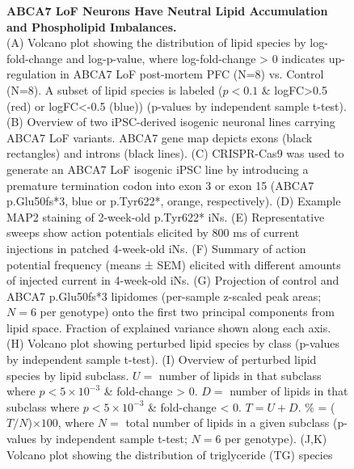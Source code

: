 \begin{figure}[ht]
    \caption{
        \textbf{ABCA7 LoF Neurons Have Neutral Lipid Accumulation and Phospholipid Imbalances.}\\[1ex]
        (A) Volcano plot showing the distribution of lipid species by log-fold-change and log-p-value, where log-fold-change > 0 indicates up-regulation in ABCA7 LoF post-mortem PFC (N=8) vs. Control (N=8). A subset of lipid species is labeled ($p<0.1$ \& logFC>0.5 (red) or logFC<-0.5 (blue)) (p-values by independent sample t-test). 
        (B) Overview of two iPSC-derived isogenic neuronal lines carrying ABCA7 LoF variants. ABCA7 gene map depicts exons (black rectangles) and introns (black lines). 
        (C) CRISPR-Cas9 was used to generate an ABCA7 LoF isogenic iPSC line by introducing a premature termination codon into exon 3 or exon 15 (ABCA7 p.Glu50fs*3, blue or p.Tyr622*, orange, respectively). 
        (D) Example MAP2 staining of 2-week-old p.Tyr622* iNs. 
        (E) Representative sweeps show action potentials elicited by 800 ms of current injections in patched 4-week-old iNs. 
        (F) Summary of action potential frequency (means ± SEM) elicited with different amounts of injected current in 4-week-old iNs. 
        (G) Projection of control and ABCA7 p.Glu50fs*3 lipidomes (per-sample z-scaled peak areas; $N=6$ per genotype) onto the first two principal components from lipid space. Fraction of explained variance shown along each axis. 
        (H) Volcano plot showing perturbed lipid species by class (p-values by independent sample t-test). 
        (I) Overview of perturbed lipid species by lipid subclass. $U =$ number of lipids in that subclass where $p<5 \times 10^{-3}$ \& fold-change > 0. $D =$ number of lipids in that subclass where $p<5 \times 10^{-3}$ \& fold-change < 0. $T = U + D$. \% = ($T/N$)$\times 100$, where $N =$ total number of lipids in a given subclass (p-values by independent sample t-test; $N=6$ per genotype). (J,K) Volcano plot showing the distribution of triglyceride (TG) species 
}
\end{figure}

